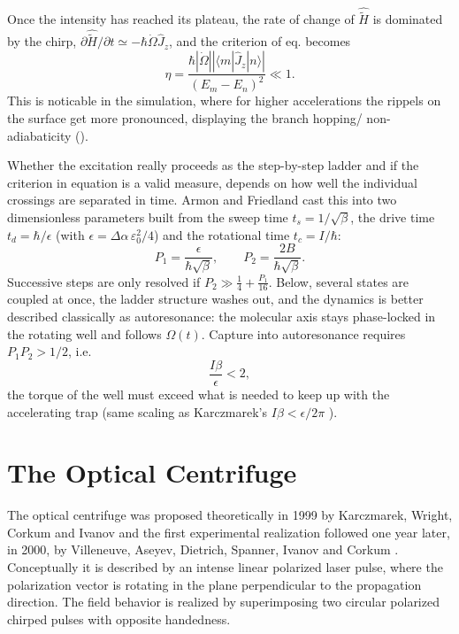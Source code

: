 Once the intensity has reached its plateau, the rate of change of $\hat{\tilde H}$ is dominated by the chirp, $\partial\hat{\tilde H}/\partial t \simeq -\hbar\dot\Omega\hat J_z$, and the criterion of eq.  becomes
\begin{equation}
    \eta = \frac{\hbar|\dot\Omega|\left|\langle m|\hat J_z|n\rangle\right|}{\left(E_m-E_n\right)^2} \ll 1 .
    \label{eq:adiabaticity_chirp}
\end{equation}
This is noticable in the simulation, where for higher accelerations the rippels on the surface get more pronounced, displaying the branch hopping/ non-adiabaticity ().

Whether the excitation really proceeds as the step-by-step ladder and if the criterion in equation  is a valid measure, depends on how well the individual crossings are separated in time. Armon and Friedland
\cite{armonQuantumClassicalDynamics2017} cast this into two dimensionless parameters built from the sweep time $t_s=1/\sqrt{\beta}$, the drive time $t_d=\hbar/\epsilon$ (with $\epsilon=\Delta\alpha\,\varepsilon_0^2/4$) and the rotational time $t_c=I/\hbar$:
\begin{equation}
    P_1=\frac{\epsilon}{\hbar\sqrt{\beta}},\qquad
    P_2=\frac{2B}{\hbar\sqrt{\beta}} .
    \label{eq:armon_parameters}
\end{equation}
Successive steps are only resolved if $P_2\gg\tfrac14+\tfrac{P_1}{16}$. Below, several states are coupled
at once, the ladder structure washes out, and the dynamics is better described classically as
autoresonance: the molecular axis stays phase-locked in the rotating well and follows $\Omega(t)$.
Capture into autoresonance requires $P_1P_2>1/2$, i.e.
\begin{equation}
    \frac{I\beta}{\epsilon}<2 ,
    \label{eq:autoresonance_condition}
\end{equation}
the torque of the well must exceed what is needed to keep up with the accelerating trap (same scaling as Karczmarek's $I\beta<\epsilon/2\pi$ \cite{karczmarekOpticalCentrifugeMolecules1999}).


\section{The Optical Centrifuge}
\label{sec:optical_centrifuge}

The optical centrifuge was proposed theoretically in 1999 by Karczmarek, Wright, Corkum and Ivanov \cite{karczmarekOpticalCentrifugeMolecules1999} and the first experimental realization followed one year later, in 2000, by Villeneuve, Aseyev, Dietrich, Spanner, Ivanov and Corkum \cite{villeneuveForcedMolecularRotation2000}. Conceptually it is described by an intense linear polarized laser pulse, where the polarization vector is rotating in the plane perpendicular to the propagation direction. The field behavior is realized by superimposing two circular polarized chirped pulses with opposite handedness.

